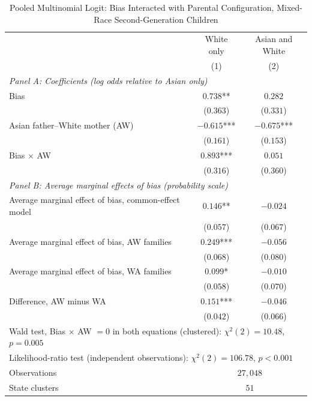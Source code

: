 \begin{table}[H]
\centering
\small{}
\caption{Pooled Multinomial Logit: Bias Interacted with Parental Configuration, Mixed-Race Second-Generation Children \label{tab:pooled-mnl-bias-x-aw}}
\begin{threeparttable}
\begin{tabular}{lcc}
\toprule
 & White only & Asian and White \\
 & (1) & (2) \\
\midrule
\multicolumn{3}{l}{\textit{Panel A: Coefficients (log odds relative to Asian only)}} \\
Bias & $0.738$** & $0.282$ \\
 & ($0.363$) & ($0.331$) \\
Asian father--White mother (AW) & $-0.615$*** & $-0.675$*** \\
 & ($0.161$) & ($0.153$) \\
Bias $\times$ AW & $0.893$*** & $0.051$ \\
 & ($0.316$) & ($0.360$) \\
\midrule
\multicolumn{3}{l}{\textit{Panel B: Average marginal effects of bias (probability scale)}} \\
Average marginal effect of bias, common-effect model & $0.146$** & $-0.024$ \\
 & ($0.057$) & ($0.067$) \\
Average marginal effect of bias, AW families & $0.249$*** & $-0.056$ \\
 & ($0.068$) & ($0.080$) \\
Average marginal effect of bias, WA families & $0.099$* & $-0.010$ \\
 & ($0.058$) & ($0.070$) \\
Difference, AW minus WA & $0.151$*** & $-0.046$ \\
 & ($0.042$) & ($0.066$) \\
\midrule
\multicolumn{3}{l}{Wald test, Bias $\times$ AW $= 0$ in both equations (clustered): $\chi^2(2) = 10.48$, $p = 0.005$} \\
\multicolumn{3}{l}{Likelihood-ratio test (independent observations): $\chi^2(2) = 106.78$, $p < 0.001$} \\
Observations & \multicolumn{2}{c}{$27{,}048$} \\
State clusters & \multicolumn{2}{c}{$51$} \\
\bottomrule
\end{tabular}
\begin{tablenotes}
\small

\end{tablenotes}
\end{threeparttable}
\end{table}
